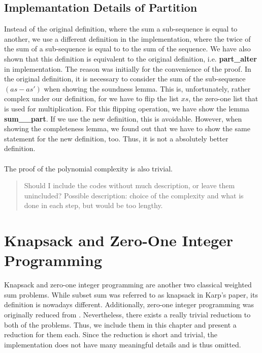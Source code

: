 \subsection{Implemantation Details of Partition}
Instead of the original definition, where the sum a sub-sequence is equal to another, we use a different definition in the implementation,
where the twice of the sum of a sub-sequence is equal to to the sum of the sequence. We have also shown that this definition is equivalent 
to the original definition, i.e. \textbf{part\_alter} in implementation. 
The reason was initially for the convenience of the proof. 
In the original definition, it is necessary to consider the sum of the sub-sequence $(as - as')$ when showing the soundness lemma. This is, unfortunately, 
rather complex under our definition, for we have to flip the list $xs$, the zero-one list that is used for multiplication. For this 
flipping operation, we have show the lemma \textbf{sum\_\binary\_part}. If we use the new definition, this is avoidable.
However, when showing the completeness lemma, we found out that we have to show the same statement for the new definition, too. 
Thus, it is not a absolutely better definition. \\\\
The proof of the polynomial complexity is also trivial. 
\begin{quote}
    Should I include the codes without much description, or leave them unincluded? 
    Possible description: choice of the complexity and what is done in each step, but would be too lengthy.
\end{quote}

\section{Knapsack and Zero-One Integer Programming}
Knapsack and zero-one integer programming are another two classical weighted sum problems. While subset sum was referred 
to as knapsack in Karp's paper, its definition is nowadays different. Additionally, zero-one integer programming 
was originally reduced from \SAT. Nevertheless, there exists a really trivial reductiom to both of the problems. Thus, 
we include them in this chapter and present a reduction for them each. 
Since the reduction is short and trivial, the implementation does not have 
many meaningful details and is thus omitted. 

